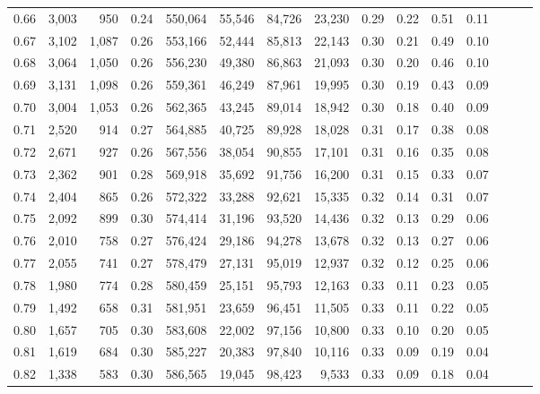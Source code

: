 \begin{tabular}{rrrrrrrrrrrrrrr}
0.66 &   3,003 &    950 &  0.24 &  550,064 &   55,546 &   84,726 &   23,230 &  0.29 &  0.22 &  0.51 &      0.11 \\
0.67 &   3,102 &  1,087 &  0.26 &  553,166 &   52,444 &   85,813 &   22,143 &  0.30 &  0.21 &  0.49 &      0.10 \\
0.68 &   3,064 &  1,050 &  0.26 &  556,230 &   49,380 &   86,863 &   21,093 &  0.30 &  0.20 &  0.46 &      0.10 \\
0.69 &   3,131 &  1,098 &  0.26 &  559,361 &   46,249 &   87,961 &   19,995 &  0.30 &  0.19 &  0.43 &      0.09 \\
0.70 &   3,004 &  1,053 &  0.26 &  562,365 &   43,245 &   89,014 &   18,942 &  0.30 &  0.18 &  0.40 &      0.09 \\
0.71 &   2,520 &    914 &  0.27 &  564,885 &   40,725 &   89,928 &   18,028 &  0.31 &  0.17 &  0.38 &      0.08 \\
0.72 &   2,671 &    927 &  0.26 &  567,556 &   38,054 &   90,855 &   17,101 &  0.31 &  0.16 &  0.35 &      0.08 \\
0.73 &   2,362 &    901 &  0.28 &  569,918 &   35,692 &   91,756 &   16,200 &  0.31 &  0.15 &  0.33 &      0.07 \\
0.74 &   2,404 &    865 &  0.26 &  572,322 &   33,288 &   92,621 &   15,335 &  0.32 &  0.14 &  0.31 &      0.07 \\
0.75 &   2,092 &    899 &  0.30 &  574,414 &   31,196 &   93,520 &   14,436 &  0.32 &  0.13 &  0.29 &      0.06 \\
0.76 &   2,010 &    758 &  0.27 &  576,424 &   29,186 &   94,278 &   13,678 &  0.32 &  0.13 &  0.27 &      0.06 \\
0.77 &   2,055 &    741 &  0.27 &  578,479 &   27,131 &   95,019 &   12,937 &  0.32 &  0.12 &  0.25 &      0.06 \\
0.78 &   1,980 &    774 &  0.28 &  580,459 &   25,151 &   95,793 &   12,163 &  0.33 &  0.11 &  0.23 &      0.05 \\
0.79 &   1,492 &    658 &  0.31 &  581,951 &   23,659 &   96,451 &   11,505 &  0.33 &  0.11 &  0.22 &      0.05 \\
0.80 &   1,657 &    705 &  0.30 &  583,608 &   22,002 &   97,156 &   10,800 &  0.33 &  0.10 &  0.20 &      0.05 \\
0.81 &   1,619 &    684 &  0.30 &  585,227 &   20,383 &   97,840 &   10,116 &  0.33 &  0.09 &  0.19 &      0.04 \\
0.82 &   1,338 &    583 &  0.30 &  586,565 &   19,045 &   98,423 &    9,533 &  0.33 &  0.09 &  0.18 &      0.04 \\

\end{tabular}

